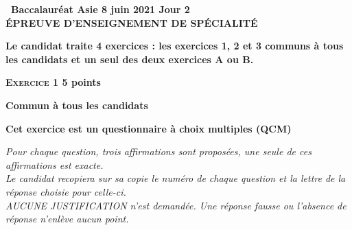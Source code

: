 \documentclass[11pt]{article}
\begin{document}
\setlength\parindent{0mm}
\pagestyle{fancy}
\thispagestyle{empty}

\begin{center}{\Large\textbf{\decofourleft~Baccalauréat Asie 8 juin 2021 Jour 2~\decofourright\\[6pt] ÉPREUVE D'ENSEIGNEMENT DE SPÉCIALITÉ}}
\end{center}

\vspace{0,25cm}

\textbf{Le candidat traite 4 exercices : les exercices 1, 2 et 3 communs à tous les candidats et un seul des deux exercices A ou B.}

\bigskip

\textbf{\textsc{Exercice 1} \hfill 5 points}

\textbf{Commun à tous les candidats}

\medskip

\textbf{Cet exercice est un questionnaire à choix multiples (QCM)}

\medskip


\emph{Pour chaque question, trois affirmations sont proposées, une seule de ces affirmations est exacte.\\
Le candidat recopiera sur sa copie le numéro de chaque question et la lettre de la réponse choisie pour celle-ci.\\
 AUCUNE JUSTIFICATION n'est demandée. Une réponse fausse ou l'absence de réponse n'enlève aucun point.}

\medskip
\end{document}
